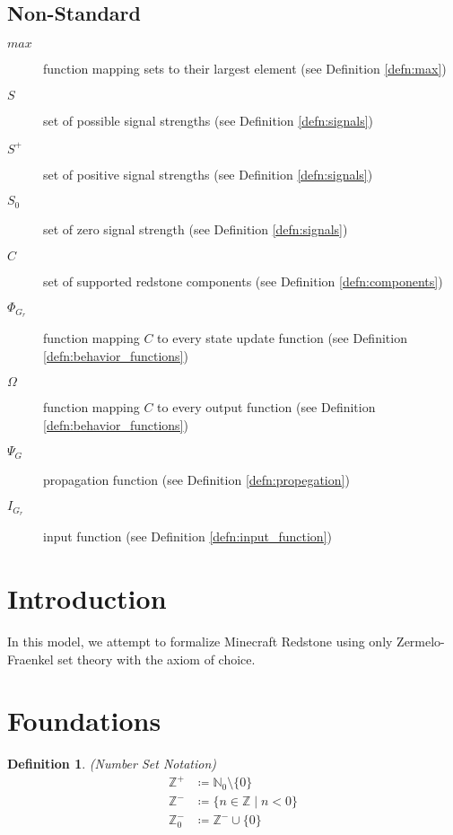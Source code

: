 \documentclass{article}
\newtheorem{defn}{Definition}[section]
\begin{document}
\begin{multicols}{2}
\columnbreak

\subsection*{Non-Standard}
\begin{description}
	\item[\(max\)] function mapping sets to their largest element (see Definition \ref{defn:max})
    \item[\(S\)] set of possible signal strengths (see Definition \ref{defn:signals})
    \item[\(S^+\)] set of positive signal strengths (see Definition \ref{defn:signals})
    \item[\(S_{0}\)] set of zero signal strength (see Definition \ref{defn:signals})
    \item[\(C\)] set of supported redstone components (see Definition \ref{defn:components})
    \item[\(\Phi_{G_{r}}\)] function mapping \(C\) to every state update function (see Definition \ref{defn:behavior_functions})
    \item[\(\Omega\)] function mapping \(C\) to every output function (see Definition \ref{defn:behavior_functions})
    \item[\(\Psi_{G}\)] propagation function (see Definition \ref{defn:propegation})
    \item[\(I_{G_{r}}\)] input function (see Definition \ref{defn:input_function})
\end{description}
\end{multicols}

\section{Introduction}
In this model, we attempt to formalize Minecraft Redstone using only Zermelo-Fraenkel set theory with the axiom of choice. 

\section{Foundations}
\noindent

\begin{defn} (Number Set Notation)
	\label{defn:number_sets}
	\begin{align}
		\mathbb{Z}^+ &\coloneq \mathbb{N}_{0} \setminus \{0\} \\
		\mathbb{Z}^- &\coloneq \{n \in \mathbb{Z}\mid n < 0\} \\
		\mathbb{Z}_{0}^- &\coloneq \mathbb{Z}^- \cup \{0\}
	\end{align}
\end{defn}
\end{document}
